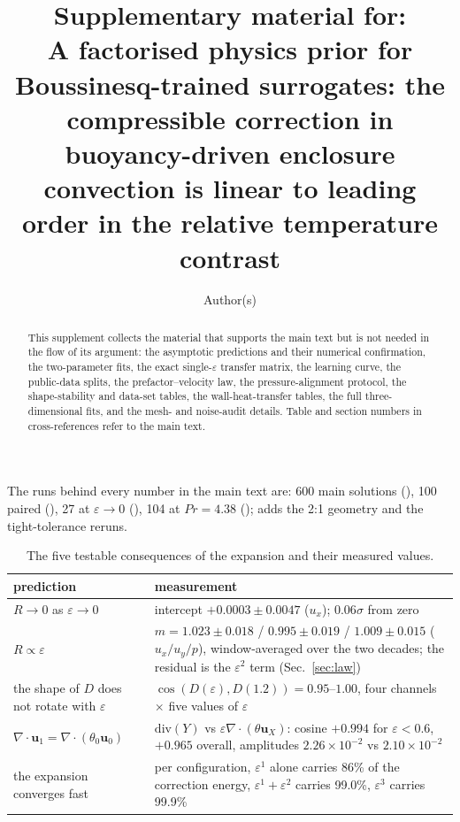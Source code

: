 \documentclass[preprint,11pt,a4paper,times,doubleblind]{elsarticle}
\begin{document}
\begin{frontmatter}
\title{Supplementary material for:\\
A factorised physics prior for Boussinesq-trained surrogates: the compressible correction in
buoyancy-driven enclosure convection is linear to leading order in the relative temperature contrast}
\author[a]{Author(s)}
\address[a]{Affiliation(s)}
\begin{abstract}
This supplement collects the material that supports the main text but is not needed in the flow of
its argument: the asymptotic predictions and their numerical confirmation, the two-parameter fits,
the exact single-$\varepsilon$ transfer matrix, the learning curve, the public-data splits, the
prefactor--velocity law, the pressure-alignment protocol, the shape-stability and data-set tables,
the wall-heat-transfer tables, the full three-dimensional fits, and the mesh- and noise-audit
details. Table and section numbers in cross-references refer to the main text.
\end{abstract}
\end{frontmatter}

The runs behind every number in the main text are: 600 main solutions
(), 100 paired (), 27 at
$\varepsilon\to0$ (), 104 at $Pr=4.38$ ();
 adds the 2:1 geometry and the tight-tolerance reruns.

\begin{table}[htbp]
\centering
\small
\caption{The five testable consequences of the expansion and their measured values.}
\label{tab:predictions}
\begin{tabular}{@{}p{3.2cm}p{9.0cm}@{}}
\toprule
prediction & measurement\\
\midrule
$R\to0$ as $\varepsilon\to0$ & intercept $+0.0003\pm0.0047$ ($u_x$); $0.06\sigma$ from zero\\
$R\propto\varepsilon$ & $m=1.023\pm0.018$ / $0.995\pm0.019$ / $1.009\pm0.015$
($u_x/u_y/p$), window-averaged over the two decades; the residual is the $\varepsilon^2$ term
(Sec.~\ref{sec:law})\\
the shape of $D$ does not rotate with $\varepsilon$ & $\cos(D(\varepsilon),D(1.2))=0.95$--$1.00$,
four channels $\times$ five values of $\varepsilon$\\
$\nabla\cdot\bm u_1=\nabla\cdot(\theta_0\bm u_0)$ & $\mathrm{div}(Y)$ vs
$\varepsilon\nabla\cdot(\theta\bm u_X)$: cosine $+0.994$ for $\varepsilon<0.6$, $+0.965$ overall,
amplitudes $2.26\times10^{-2}$ vs $2.10\times10^{-2}$\\
the expansion converges fast & per configuration, $\varepsilon^1$ alone carries 86\% of the
correction energy, $\varepsilon^1+\varepsilon^2$ carries 99.0\%, $\varepsilon^3$ carries 99.9\%\\
\bottomrule
\end{tabular}
\end{table}
\end{document}
